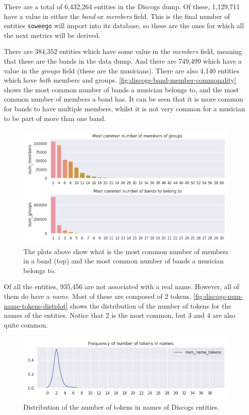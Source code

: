 \documentclass[epsfig,a4paper,11pt,titlepage,twoside,openany]{book}
\begin{document}
There are a total of 6,432,264 entities in the Discogs dump. Of these, 1,129,711 have a value in either the \textit{band} or \textit{members} field. This is the final number of entities \texttt{soweego} will import into its database, so these are the ones for which all the next metrics will be derived.

There are 384,352 entities which have some value in the \textit{members} field, meaning that these are the bands in the data dump. And there are 749,499 which have a value in the \textit{groups} field (these are the musicians). There are also 4,140 entities which have \textit{both} members and groups. \autoref{fig:discogs-band-member-commonality} shows the most common number of bands a musician belongs to, and the most common number of members a band has. It can be seen that it is more common for bands to have multiple members, whilst it is not very common for a musician to be part of more than one band.

\begin{figure}[H]
  \centering \includegraphics[width=\textwidth]{discogs_band_belonging_barplots} 
  \caption{The plots above show what is the most common number of members in a band (top) and the most common number of bands a musician belongs to.}
  \label{fig:discogs-band-member-commonality}
\end{figure}


Of all the entities, 935,456 are not associated with a real name. However, all of them do have a \textit{name}. Most of these are composed of 2 tokens. \autoref{fig:discogs-num-name-tokens-distplot} shows the distribution of the number of tokens for the names of the entities. Notice that 2 is the most common, but 3 and 4 are also quite common.

\begin{figure}[H]
  \centering \includegraphics[width=\textwidth]{discogs_distribution_num_name_tokens} 
  \caption{Distribution of the number of tokens in names of Discogs entities.}
  \label{fig:discogs-num-name-tokens-distplot}
\end{figure}
\end{document}
